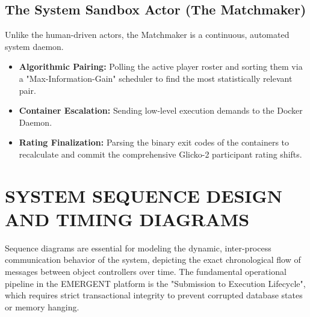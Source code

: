 \documentclass[12pt,a4paper]{report}
\begin{document}
\subsection{The System Sandbox Actor (The Matchmaker)}
Unlike the human-driven actors, the Matchmaker is a continuous, automated system daemon. 
\begin{itemize}
    \item \textbf{Algorithmic Pairing:} Polling the active player roster and sorting them via a "Max-Information-Gain" scheduler to find the most statistically relevant pair.
    \item \textbf{Container Escalation:} Sending low-level execution demands to the Docker Daemon.
    \item \textbf{Rating Finalization:} Parsing the binary exit codes of the containers to recalculate and commit the comprehensive Glicko-2 participant rating shifts.
\end{itemize}


\section{SYSTEM SEQUENCE DESIGN AND TIMING DIAGRAMS}
Sequence diagrams are essential for modeling the dynamic, inter-process communication behavior of the system, depicting the exact chronological flow of messages between object controllers over time. The fundamental operational pipeline in the EMERGENT platform is the "Submission to Execution Lifecycle", which requires strict transactional integrity to prevent corrupted database states or memory hanging.
\end{document}
